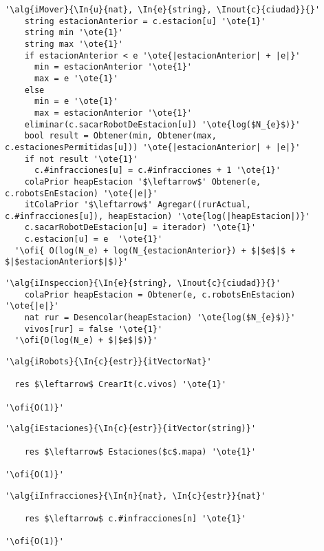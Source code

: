   \begin{lstlisting}[mathescape]
  '\alg{iMover}{\In{u}{nat}, \In{e}{string}, \Inout{c}{ciudad}}{}'
    string estacionAnterior = c.estacion[u] '\ote{1}'
    string min '\ote{1}'
    string max '\ote{1}'
    if estacionAnterior < e '\ote{|estacionAnterior| + |e|}'
      min = estacionAnterior '\ote{1}'
      max = e '\ote{1}'
    else
      min = e '\ote{1}'
      max = estacionAnterior '\ote{1}'
    eliminar(c.sacarRobotDeEstacion[u]) '\ote{log($N_{e}$)}'
    bool result = Obtener(min, Obtener(max, c.estacionesPermitidas[u])) '\ote{|estacionAnterior| + |e|}'
    if not result '\ote{1}'
      c.#infracciones[u] = c.#infracciones + 1 '\ote{1}'
    colaPrior heapEstacion '$\leftarrow$' Obtener(e, c.robotsEnEstacion) '\ote{|e|}'
    itColaPrior '$\leftarrow$' Agregar((rurActual, c.#infracciones[u]), heapEstacion) '\ote{log(|heapEstacion|)}'
    c.sacarRobotDeEstacion[u] = iterador) '\ote{1}'
    c.estacion[u] = e  '\ote{1}'
  '\ofi{ O(log(N_e) + log(N_{estacionAnterior}) + $|$e$|$ + $|$estacionAnterior$|$)}'
  \end{lstlisting}


  \begin{lstlisting}[mathescape]
  '\alg{iInspeccion}{\In{e}{string}, \Inout{c}{ciudad}}{}'
    colaPrior heapEstacion = Obtener(e, c.robotsEnEstacion)  '\ote{|e|}'
    nat rur = Desencolar(heapEstacion) '\ote{log($N_{e}$)}'
    vivos[rur] = false '\ote{1}'
  '\ofi{O(log(N_e) + $|$e$|$)}'
  \end{lstlisting}


\begin{lstlisting}[mathescape]
'\alg{iRobots}{\In{c}{estr}}{itVectorNat}'

  res $\leftarrow$ CrearIt(c.vivos) '\ote{1}'
  
'\ofi{O(1)}'
\end{lstlisting}

\begin{lstlisting}[mathescape]
'\alg{iEstaciones}{\In{c}{estr}}{itVector(string)}'

    res $\leftarrow$ Estaciones($c$.mapa) '\ote{1}'
  
'\ofi{O(1)}'
\end{lstlisting}

\begin{lstlisting}[mathescape]
'\alg{iInfracciones}{\In{n}{nat}, \In{c}{estr}}{nat}'

    res $\leftarrow$ c.#infracciones[n] '\ote{1}'
  
'\ofi{O(1)}'
\end{lstlisting}


